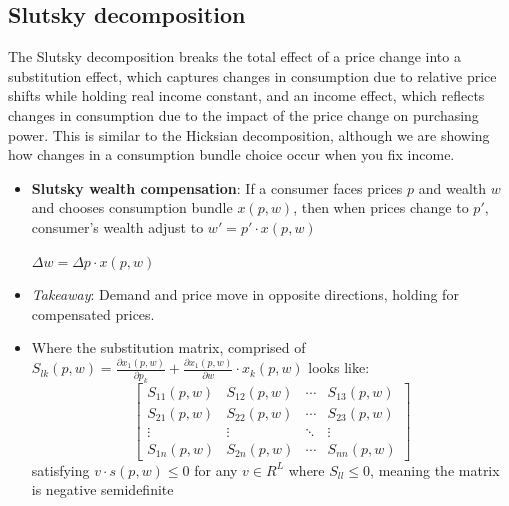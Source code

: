 \documentclass{article}
\begin{document}
\subsection{Slutsky decomposition}\label{slut}
The Slutsky decomposition breaks the total effect of a price change into a substitution effect, which captures changes in consumption due to relative price shifts while holding real income constant, and an income effect, which reflects changes in consumption due to the impact of the price change on purchasing power. This is similar to the Hicksian decomposition, although we are showing how changes in a consumption bundle choice occur when you fix income.
\begin{itemize}
    \item  \textbf{Slutsky wealth compensation}: If a consumer faces prices $p$ and wealth $w$ and chooses consumption bundle $x(p,w)$, then when prices change to $p'$, consumer's wealth adjust to $w' = p' \cdot x(p,w)$  
    \begin{center}
        $\Delta w = \Delta p \cdot x(p,w)$
    \end{center}
    \item \textit{Takeaway}: Demand and price move in opposite directions, holding for compensated prices.
    \item Where the substitution matrix, comprised of $S_{lk}(p,w) = \frac{\partial x_1(p,w)}{\partial p_k} + \frac{\partial x_1(p,w)}{\partial w} \cdot x_k(p,w)$ looks like: 
     \[
        \begin{bmatrix}\label{submatrix}
        S_{11}(p,w) & S_{12}(p,w) & \cdots & S_{13}(p,w) \\
        S_{21}(p,w) & S_{22}(p,w)  & \cdots & S_{23}(p,w) \\
        \vdots & \vdots & \ddots & \vdots \\
        S_{1n}(p,w) & S_{2n}(p,w) & \cdots & S_{nn}(p,w) 
        \end{bmatrix}
        \]
    satisfying $v \cdot s(p,w) \leq 0$ for any $v \in R^L$ where $S_{ll} \leq 0$, meaning the matrix is negative semidefinite 
    
\end{itemize}
\end{document}

